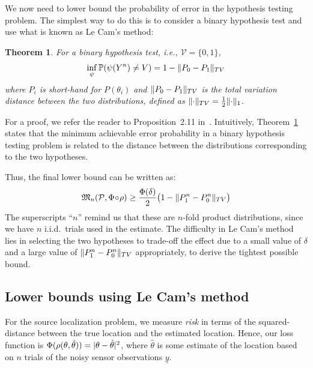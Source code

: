 \documentclass[conference]{IEEEtran}
\providecommand{\v}{}
\renewcommand{\v}[1]{\underline{#1}}
\DeclarePairedDelimiter\abs{\lvert}{\rvert}
\DeclarePairedDelimiter\norm{\lVert}{\rVert}
\newcommand{\Phiorho}{\Phi\!\circ\!\rho}
\newtheorem{theorem}{Theorem}
\begin{document}
We now need to lower bound the probability of error in the hypothesis testing
problem. The simplest way to do this is to consider a binary hypothesis test
and use what is known as Le Cam's method:
\begin{theorem} \label{thm:le-cam}
	For a binary hypothesis test, i.e., $\mathcal{V} = \{0, 1\}$,
	\begin{equation}
		\inf_\psi \mathbb P(\psi(Y^n) \neq V) = 1 - \norm{P_0 - P_1}_{TV}
	\end{equation}
	where $P_i$ is short-hand for $P(\theta_i)$ and $\norm{P_0 - P_1}_{TV}$ is
	the total variation distance between the two distributions, defined as
	$\norm{\cdot}_{TV} = \frac{1}{2} \norm{\cdot}_1$.
\end{theorem}
For a proof, we refer the reader to Proposition~2.11
in~\cite{Duchi2015Information}. Intuitively, Theorem~\ref{thm:le-cam} states
that the minimum achievable error probability in a binary hypothesis testing
problem is related to the distance between the distributions corresponding to
the two hypotheses.

Thus, the final lower bound can be written as:
\begin{equation} \label{eq:le-cam-bound}
	\mathfrak{M}_n(\mathcal P, \Phiorho) \geq \frac{\Phi(\delta)}{2} \big(1 - \norm{P_1^n - P_0^n}_{TV}\big)
\end{equation}
The superscripts ``$n$'' remind us that these are $n$-fold product
distributions, since we have $n$ i.i.d.\ trials used in the estimate.  The
difficulty in Le Cam's method lies in selecting the two hypotheses to trade-off
the effect due to a small value of $\delta$ and a large value of $\norm{P_1^n -
P_0^n}_{TV}$ appropriately, to derive the tightest possible bound.

\subsection{Lower bounds using Le Cam's method}
\label{sec:lecam-lb}

For the source localization problem, we measure \emph{risk} in terms of the
squared-distance between the true location and the estimated location. Hence,
our loss function is $\Phi(\rho(\theta, \hat\theta)) = \abs{\theta -
\hat\theta}^2$, where $\hat\theta$ is some estimate of the location based on
$n$ trials of the noisy sensor observations $\v y$.
\end{document}
